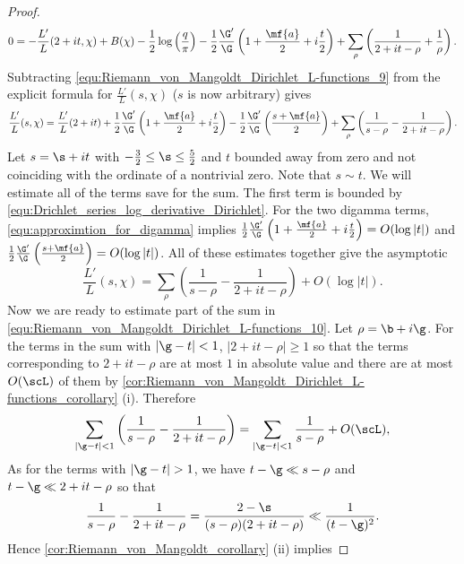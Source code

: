 \begin{proof}
\begin{equation}
          0 = -\frac{L'}{L}(2+it,\chi)+B(\chi)-\frac{1}{2}\log\left(\frac{q}{\pi}\right)-\frac{1}{2}\frac{\G'}{\G}\left(1+\frac{\mf{a}}{2}+i\frac{t}{2}\right)+\sum_{\rho}\left(\frac{1}{2+it-\rho}+\frac{1}{\rho}\right).
        \end{equation}
        Subtracting \cref{equ:Riemann_von_Mangoldt_Dirichlet_L-functions_9} from the explicit formula for $\frac{L'}{L}(s,\chi)$ ($s$ is now arbitrary) gives
        \[
          \frac{L'}{L}(s,\chi) = \frac{L'}{L}(2+it)+\frac{1}{2}\frac{\G'}{\G}\left(1+\frac{\mf{a}}{2}+i\frac{t}{2}\right)-\frac{1}{2}\frac{\G'}{\G}\left(\frac{s+\mf{a}}{2}\right)+\sum_{\rho}\left(\frac{1}{s-\rho}-\frac{1}{2+it-\rho}\right).
        \]
        Let $s = \s+it$ with $-\frac{3}{2} \le \s \le \frac{5}{2}$ and $t$ bounded away from zero and not coinciding with the ordinate of a nontrivial zero. Note that $s \sim t$. We will estimate all of the terms save for the sum. The first term is bounded by \cref{equ:Drichlet_series_log_derivative_Dirichlet}. For the two digamma terms, \cref{equ:approximtion_for_digamma} implies $\frac{1}{2}\frac{\G'}{\G}\left(1+\frac{\mf{a}}{2}+i\frac{t}{2}\right) = O(\log|t|)$ and $\frac{1}{2}\frac{\G'}{\G}\left(\frac{s+\mf{a}}{2}\right) = O(\log|t|)$. All of these estimates together give the asymptotic
        \begin{equation}\label{equ:Riemann_von_Mangoldt_Dirichlet_L-functions_10}
          \frac{L'}{L}(s,\chi) = \sum_{\rho}\left(\frac{1}{s-\rho}-\frac{1}{2+it-\rho}\right)+O(\log|t|).
        \end{equation}
        Now we are ready to estimate part of the sum in \cref{equ:Riemann_von_Mangoldt_Dirichlet_L-functions_10}. Let $\rho = \b+i\g$. For the terms in the sum with $|\g-t| < 1$, $|2+it-\rho| \ge 1$ so that the terms corresponding to $2+it-\rho$ are at most $1$ in absolute value and there are at most $O(\scL)$ of them by \cref{cor:Riemann_von_Mangoldt_Dirichlet_L-functions_corollary} (i). Therefore
        \begin{equation}\label{equ:Riemann_von_Mangoldt_Dirichlet_L-functions_11}
          \sum_{|\g-t| < 1}\left(\frac{1}{s-\rho}-\frac{1}{2+it-\rho}\right) = \sum_{|\g-t| < 1}\frac{1}{s-\rho}+O(\scL),
        \end{equation}
        As for the terms with $|\g-t| > 1$, we have $t-\g \ll s-\rho$ and $t-\g \ll 2+it-\rho$ so that
        \[
          \frac{1}{s-\rho}-\frac{1}{2+it-\rho} = \frac{2-\s}{(s-\rho)(2+it-\rho)} \ll \frac{1}{(t-\g)^{2}}.
        \]
        Hence \cref{cor:Riemann_von_Mangoldt_corollary} (ii) implies

\end{proof}
